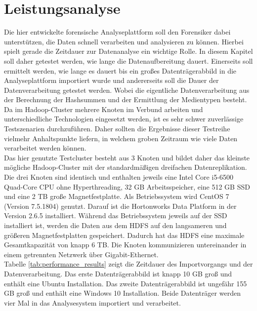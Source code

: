\section{Leistungsanalyse}
\label{sec:performance_analysis}
Die hier entwickelte forensische Analyseplattform soll den Forensiker dabei unterstützen, die Daten schnell verarbeiten und analysieren zu können. Hierbei spielt gerade die Zeitdauer zur Datenanalyse ein wichtige Rolle. In diesem Kapitel soll daher getestet werden, wie lange die Datenaufbereitung dauert. Einerseits soll ermittelt werden, wie lange es dauert bis ein großes Datenträgerabbild in die Analyseplattform importiert wurde und andererseits soll die Dauer der Datenverarbeitung getestet werden. Wobei die eigentliche Datenverarbeitung aus der Berechnung der Hashsummen und der Ermittlung der Medientypen besteht.\\

\noindent
Da im Hadoop-Cluster mehrere Knoten im Verbund arbeiten und unterschiedliche Technologien eingesetzt werden, ist es sehr schwer zuverlässige Testszenarien durchzuführen. Daher sollten die Ergebnisse dieser Testreihe vielmehr Anhaltspunkte liefern, in welchem groben Zeitraum wie viele Daten verarbeitet werden können.\\

\noindent
Das hier genutzte Testcluster besteht aus 3 Knoten und bildet daher das kleinste mögliche Hadoop-Cluster mit der standardmäßigen dreifachen Datenreplikation. Die drei Knoten sind identisch und enthalten jeweils eine Intel Core i5-6500 Quad-Core CPU ohne Hyperthreading, 32 GB Arbeitsspeicher, eine 512 GB SSD und eine 2 TB große Magnetfestplatte. Als Betriebssystem wird CentOS 7 (Version 7.5.1804) genutzt. Darauf ist die Hortonworks Data Platform in der Version 2.6.5 installiert. Während das Betriebssystem jeweils auf der SSD installiert ist, werden die Daten aus dem HDFS auf den langsameren und größeren Magnetfestplatten gespeichert. Dadurch hat das HDFS eine maximale Gesamtkapazität von knapp 6 TB. Die Knoten kommunizieren untereinander in einem getrennten Netzwerk über Gigabit-Ethernet.\\  

\noindent
Tabelle \ref{tab:performance_results} zeigt die Zeitdauer des Importvorgangs und der Datenverarbeitung. Das erste Datenträgerabbild ist knapp 10 GB groß und enthält eine Ubuntu Installation. Das zweite Datenträgerabbild ist ungefähr 155 GB groß und enthält eine Windows 10 Installation. Beide Datenträger werden vier Mal in das Analysesystem importiert und verarbeitet.\\


